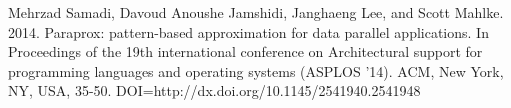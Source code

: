\documentclass[12pt,conference]{IEEEtran}
\begin{document}
%
%
%
\begin{thebibliography}{1}

Mehrzad Samadi, Davoud Anoushe Jamshidi, Janghaeng Lee, and Scott Mahlke. 2014. Paraprox: pattern-based approximation for data parallel applications. In Proceedings of the 19th international conference on Architectural support for programming languages and operating systems (ASPLOS '14). ACM, New York, NY, USA, 35-50. DOI=http://dx.doi.org/10.1145/2541940.2541948 
\end{thebibliography}




\end{document}
